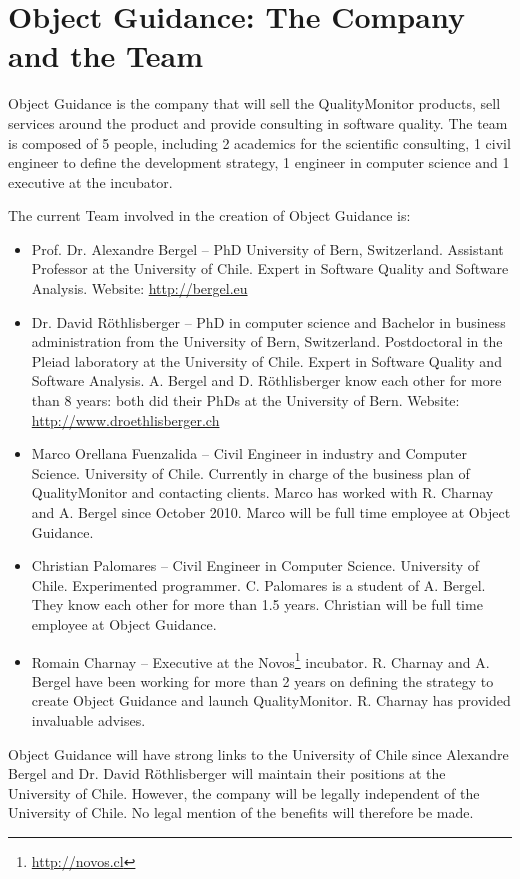\documentclass[runningheads]{llncs}
\newcommand{\seclabel}[1]{\label{sec:#1}}
\begin{document}
\section{Object Guidance: The Company and the Team} \seclabel{team}

Object Guidance is the company that will sell the QualityMonitor products, sell services around the product and provide consulting in software quality. The team is composed of 5 people, including 2 academics for the scientific consulting, 1 civil engineer to define the development strategy, 1 engineer in computer science and 1 executive at the incubator.

The current Team involved in the creation of Object Guidance is:
\begin{itemize}

\item Prof. Dr. Alexandre Bergel -- PhD University of Bern, Switzerland. Assistant Professor at the University of Chile. Expert in Software Quality and Software Analysis. Website: \url{http://bergel.eu}
\item Dr. David R\"othlisberger -- PhD in computer science and Bachelor in business administration from the University of Bern, Switzerland. Postdoctoral in the Pleiad laboratory at the University of Chile. Expert in Software Quality and Software Analysis. A. Bergel and D. R\"othlisberger know each other for more than 8 years: both did their PhDs at the University of Bern. Website: \url{http://www.droethlisberger.ch}
\item Marco Orellana Fuenzalida -- Civil Engineer in industry and Computer Science. University of Chile. Currently in charge of the business plan of QualityMonitor and contacting clients. Marco has worked with R. Charnay and A. Bergel since October 2010. Marco will be full time employee at Object Guidance.
\item Christian Palomares -- Civil Engineer in Computer Science. University of Chile. Experimented programmer. C. Palomares is a student of A. Bergel. They know each other for more than 1.5 years. Christian will be full time employee at Object Guidance.
\item Romain Charnay -- Executive at the Novos\footnote{\url{http://novos.cl}} incubator. R. Charnay and A. Bergel have been working for more than 2 years on defining the strategy to create Object Guidance and launch QualityMonitor. R. Charnay has provided invaluable advises.
\end{itemize}

Object Guidance will have strong links to the University of Chile since Alexandre Bergel and Dr. David R\"othlisberger will maintain their positions at the University of Chile. However, the company will be legally independent of the University of Chile. No legal mention of the benefits will therefore be made. 
\end{document}
